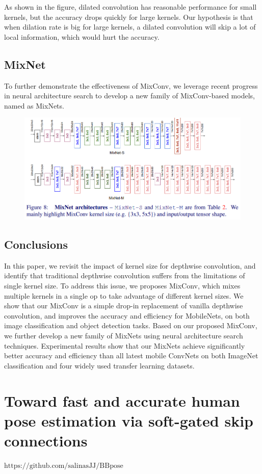 \documentclass[11pt]{article}
\begin{document}
As shown in the figure, dilated convolution has reasonable performance for small kernels, but the accuracy drops quickly for large kernels. Our hypothesis is that when dilation rate is big for large kernels, a dilated convolution will skip a lot of local information, which would hurt the accuracy.
\subsection{MixNet}
To further demonstrate the effectiveness of MixConv, we leverage recent progress in neural architecture search to develop a new family of MixConv-based models, named as MixNets.
\begin{figure}[H]
	\centering
	\includegraphics[scale = 0.5]{58}
\end{figure}
\subsection{Conclusions}
In this paper, we revisit the impact of kernel size for depthwise convolution, and identify that traditional depthwise convolution suffers from the limitations of single kernel size. To address this issue, we proposes MixConv, which mixes multiple kernels in a single op to take advantage of different kernel sizes. We show that our MixConv is a simple drop-in replacement of vanilla depthwise convolution, and improves the accuracy and efficiency for MobileNets, on both image classification and object detection tasks. Based on our proposed MixConv, we further develop a new family of MixNets using neural architecture search techniques. Experimental results show that our MixNets achieve significantly better accuracy and efficiency than all latest mobile ConvNets on both ImageNet classification and four widely used transfer learning datasets.
\section{Toward fast and accurate human pose estimation via soft-gated skip connections}
$\text{https://github.com/salinasJJ/BBpose}$
\end{document}
